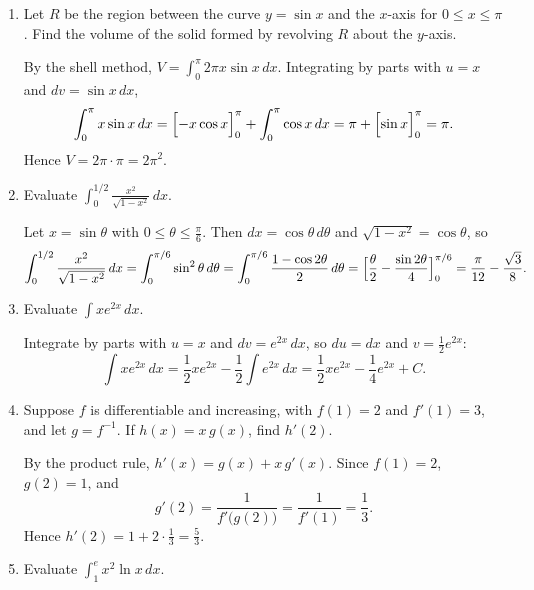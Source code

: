 \documentclass[12pt,letterpaper]{article}
\begin{document}
\begin{enumerate}[label=\textbf{\arabic*.},leftmargin=2em,itemsep=1.25em]
  \item Let $R$ be the region between the curve $y=\sin x$ and the $x$-axis
    for $0\le x\le\pi$. Find the volume of the solid formed by revolving $R$
    about the $y$-axis.

    \begin{solution}
      By the shell method, $V=\displaystyle\int_0^\pi2\pi x\sin x\,dx$.
      Integrating by parts with $u=x$ and $dv=\sin x\,dx$,
      \[
        \int_0^\pi x\sin x\,dx=\Bigl[-x\cos x\Bigr]_0^\pi+\int_0^\pi\cos x\,dx
        =\pi+\Bigl[\sin x\Bigr]_0^\pi=\pi.
      \]
      Hence $V=2\pi\cdot\pi=2\pi^2$.
    \end{solution}

  \item Evaluate $\displaystyle\int_0^{1/2}\frac{x^2}{\sqrt{1-x^2}}\,dx$.

    \begin{solution}
      Let $x=\sin\theta$ with $0\le\theta\le\frac\pi6$. Then
      $dx=\cos\theta\,d\theta$ and $\sqrt{1-x^2}=\cos\theta$, so
      \[
        \int_0^{1/2}\frac{x^2}{\sqrt{1-x^2}}\,dx
        =\int_0^{\pi/6}\sin^2\theta\,d\theta
        =\int_0^{\pi/6}\frac{1-\cos2\theta}{2}\,d\theta
        =\Bigl[\frac\theta2-\frac{\sin2\theta}{4}\Bigr]_0^{\pi/6}
        =\frac{\pi}{12}-\frac{\sqrt3}{8}.
      \]
    \end{solution}

  \item Evaluate $\displaystyle\int xe^{2x}\,dx$.

    \begin{solution}
      Integrate by parts with $u=x$ and $dv=e^{2x}\,dx$, so $du=dx$ and
      $v=\frac12e^{2x}$:
      \[
        \int xe^{2x}\,dx=\frac12xe^{2x}-\frac12\int e^{2x}\,dx
        =\frac12xe^{2x}-\frac14e^{2x}+C.
      \]
    \end{solution}

  \item Suppose $f$ is differentiable and increasing, with $f(1)=2$ and
    $f'(1)=3$, and let $g=f^{-1}$. If $h(x)=x\,g(x)$, find $h'(2)$.

    \begin{solution}
      By the product rule, $h'(x)=g(x)+x\,g'(x)$. Since $f(1)=2$,
      $g(2)=1$, and
      \[
        g'(2)=\frac{1}{f'\bigl(g(2)\bigr)}=\frac{1}{f'(1)}=\frac13.
      \]
      Hence $h'(2)=1+2\cdot\frac13=\frac53$.
    \end{solution}

  \item Evaluate $\displaystyle\int_1^e x^2\ln x\,dx$.


\end{enumerate}
\end{document}
